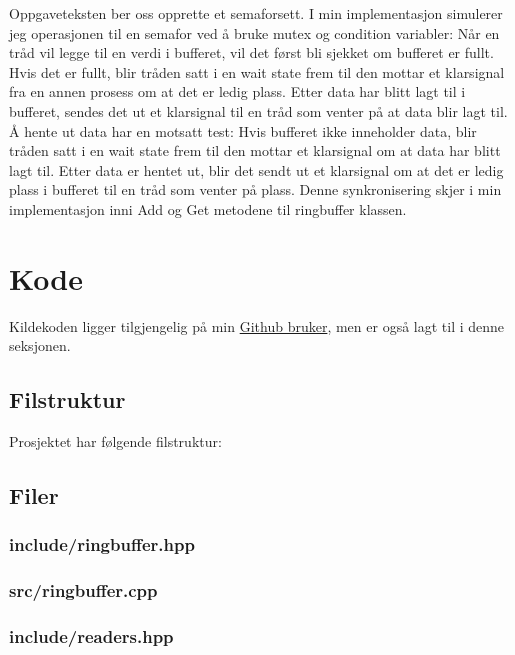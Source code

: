 \documentclass[a4paper, 12pt]{article}
\begin{document}
    Oppgaveteksten ber oss opprette et semaforsett. I min implementasjon simulerer jeg operasjonen til en semafor ved å bruke mutex og condition variabler: Når en tråd vil legge til en verdi i bufferet, vil det først bli sjekket om bufferet er fullt. Hvis det er fullt, blir tråden satt i en wait state frem til den mottar et klarsignal fra en annen prosess om at det er ledig plass. Etter data har blitt lagt til i bufferet, sendes det ut et klarsignal til en tråd som venter på at data blir lagt til. Å hente ut data har en motsatt test: Hvis bufferet ikke inneholder data, blir tråden satt i en wait state frem til den mottar et klarsignal om at data har blitt lagt til. Etter data er hentet ut, blir det sendt ut et klarsignal om at det er ledig plass i bufferet til en tråd som venter på plass. Denne synkronisering skjer i min implementasjon inni Add og Get metodene til ringbuffer klassen.

    \section{Kode}
    Kildekoden ligger tilgjengelig på min {\color{cyan}\href{https://github.com/rubensorensen/ringbuffer}{Github bruker}}, men er også lagt til i denne seksjonen.

    \subsection{Filstruktur}
    Prosjektet har følgende filstruktur:

    \subsection{Filer}
    \subsubsection{include/ringbuffer.hpp}
    
    \clearpage
    \subsubsection{src/ringbuffer.cpp}
    
    \clearpage
    \subsubsection{include/readers.hpp}
    
    \clearpage
\end{document}
